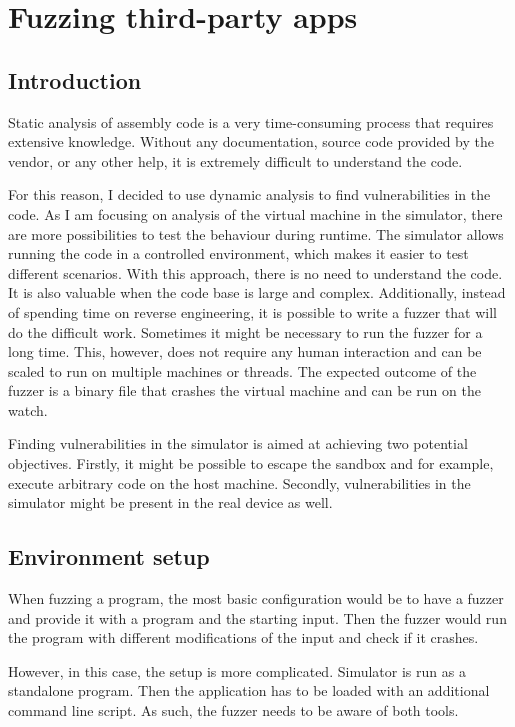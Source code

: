 \chapter{Fuzzing third-party apps} \label{sec:fuzzing}
\section{Introduction}
Static analysis of assembly code is a very time-consuming process that requires extensive knowledge.
Without any documentation, source code provided by the vendor, or any other help, it is extremely difficult to understand the code.

For this reason, I decided to use dynamic analysis to find vulnerabilities in the code.
As I am focusing on analysis of the virtual machine in the simulator, there are more possibilities to test the behaviour during runtime.
The simulator allows running the code in a controlled environment, which makes it easier to test different scenarios.
With this approach, there is no need to understand the code.
It is also valuable when the code base is large and complex.
Additionally, instead of spending time on reverse engineering, it is possible to write a fuzzer that will do the difficult work.
Sometimes it might be necessary to run the fuzzer for a long time.
This, however, does not require any human interaction and can be scaled to run on multiple machines or threads.
The expected outcome of the fuzzer is a binary file that crashes the virtual machine and can be run on the watch.

Finding vulnerabilities in the simulator is aimed at achieving two potential objectives.
Firstly, it might be possible to escape the sandbox and for example, execute arbitrary code on the host machine.
Secondly, vulnerabilities in the simulator might be present in the real device as well.

\section{Environment setup}
When fuzzing a program, the most basic configuration would be to have a fuzzer and provide it with a program and the starting input.
Then the fuzzer would run the program with different modifications of the input and check if it crashes.

However, in this case, the setup is more complicated.
Simulator is run as a standalone program.
Then the application has to be loaded with an additional command line script.
As such, the fuzzer needs to be aware of both tools.

